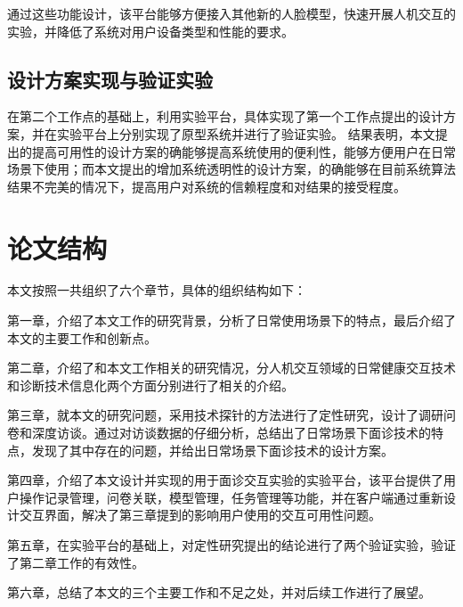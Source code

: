 通过这些功能设计，该平台能够方便接入其他新的人脸模型，快速开展人机交互的实验，并降低了系统对用户设备类型和性能的要求。


\subsection{设计方案实现与验证实验}

在第二个工作点的基础上，利用实验平台，具体实现了第一个工作点提出的设计方案，并在实验平台上分别实现了原型系统并进行了验证实验。
结果表明，本文提出的提高可用性的设计方案的确能够提高系统使用的便利性，能够方便用户在日常场景下使用；而本文提出的增加系统透明性的设计方案，的确能够在目前系统算法结果不完美的情况下，提高用户对系统的信赖程度和对结果的接受程度。




\section{论文结构}
本文按照一共组织了六个章节，具体的组织结构如下：

第一章，介绍了本文工作的研究背景，分析了日常使用场景下的特点，最后介绍了本文的主要工作和创新点。

第二章，介绍了和本文工作相关的研究情况，分人机交互领域的日常健康交互技术和诊断技术信息化两个方面分别进行了相关的介绍。

第三章，就本文的研究问题，采用技术探针的方法进行了定性研究，设计了调研问卷和深度访谈。通过对访谈数据的仔细分析，总结出了日常场景下面诊技术的特点，发现了其中存在的问题，并给出日常场景下面诊技术的设计方案。

第四章，介绍了本文设计并实现的用于面诊交互实验的实验平台，该平台提供了用户操作记录管理，问卷关联，模型管理，任务管理等功能，并在客户端通过重新设计交互界面，解决了第三章提到的影响用户使用的交互可用性问题。

第五章，在实验平台的基础上，对定性研究提出的结论进行了两个验证实验，验证了第二章工作的有效性。

第六章，总结了本文的三个主要工作和不足之处，并对后续工作进行了展望。